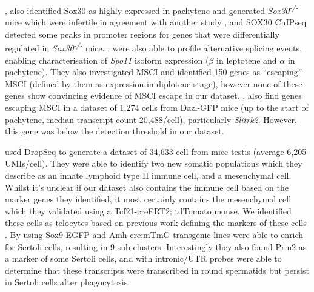 \cite{Chen2018Singlecell}, also identified Sox30 as highly expressed in pachytene and generated \textit{Sox30\textsuperscript{-/-}} mice which were infertile in agreement with another study \parencite{Feng2017SOX30}, and SOX30 ChIPseq detected some peaks in promoter regions for genes that were differentially regulated in \textit{Sox30\textsuperscript{-/-}} mice. \cite{Chen2018Singlecell}, were also able to profile alternative splicing events, enabling characterisation of \textit{Spo11} isoform expression ($\beta$ in leptotene and $\alpha$ in pachytene). They also investigated MSCI and identified 150 genes as ``escaping'' MSCI (defined by them as expression in diplotene stage), however none of these genes show convincing evidence of MSCI escape in our dataset. \cite{Vertesy2019Dynamics}, also find genes escaping MSCI in a dataset of 1,274 cells from Dazl-GFP mice (up to the start of pachytene, median transcript count 20,488/cell), particularly \textit{Slitrk2}. However, this gene was below the detection threshold in our dataset.

\cite{Green2018Comprehensive} used DropSeq to generate a dataset of 34,633 cell from mice testis (average 6,205 UMIs/cell). They were able to identify two new somatic populations which they describe as an innate lymphoid type II immune cell, and a mesenchymal cell. Whilst it's unclear if our dataset also contains the immune cell based on the marker genes they identified, it most certainly contains the mesenchymal cell which they validated using a Tcf21-creERT2; tdTomato mouse. We identified these cells as telocytes based on previous work defining the markers of these cells \parencite{Marini2018Reappraising}. By using Sox9-EGFP and Amh-cre;mTmG transgenic lines \cite{Green2018Comprehensive} were able to enrich for Sertoli cells, resulting in 9 sub-clusters. Interestingly they also found Prm2 as a marker of some Sertoli cells, and with intronic/UTR probes were able to determine that these transcripts were transcribed in round spermatids but persist in Sertoli cells after phagocytosis.

